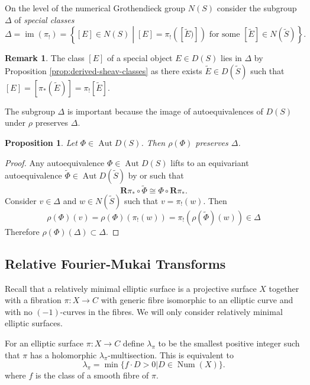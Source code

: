 \documentclass[a4paper, 12pt, twoside]{amsart}
\theoremstyle{plain}
\newtheorem{proposition}[theorem]{Proposition}
\theoremstyle{definition}
\newtheorem{remark}[theorem]{Remark}
\DeclareMathOperator{\iso}{\cong}
\DeclareMathOperator{\num}{Num}
\DeclareMathOperator{\im}{im}
\DeclareMathOperator{\Aut}{Aut}
\begin{document}
On the level of the numerical Grothendieck group $N(S)$ consider
the subgroup $\Delta$ of \emph{special classes}
\[
  \Delta = \im(\pi_!) = \left\{ [E] \in N(S) \middle| [E] =
    \pi_!([\widetilde{E})]) \text{ for some } [\widetilde{E}] \in
    N(\widetilde{S}) \right\}.
\]

\begin{remark}
  The class $[E]$ of a special object $E \in D(S)$ lies in $\Delta$ by
  Proposition \ref{prop:derived-sheav-classes} as there exists
  $\widetilde{E} \in D(\widetilde{S})$ such that
  $[E] = [\pi_*(\widetilde{E})] = \pi_![\widetilde{E}]$.
\end{remark}

The subgroup $\Delta$ is important because the image of
autoequivalences of $D(S)$ under $\rho$ preserves $\Delta$.

\begin{proposition}\label{prop:auto-delta}
  Let $\Phi \in \Aut D(S)$. Then $\rho(\Phi)$ preserves $\Delta$.
\end{proposition}
\begin{proof}
Any autoequivalence $\Phi \in \Aut D(S)$ lifts to an equivariant
autoequivalence $\widetilde{\Phi} \in \Aut D(\widetilde{S})$ by
\cite[Theorem 4.5]{MR1629929} or \cite[Theorem 7.13]{MR2511017} such
that
\[
  \mathbf{R}\pi_* \circ \widetilde{\Phi} \iso \Phi \circ
  \mathbf{R}\pi_*.
\] 
Consider $v \in \Delta$ and $w \in N(\widetilde{S})$ such that
$v = \pi_!(w)$. Then
\[
  \rho(\Phi)(v) = \rho(\Phi)(\pi_!(w)) =
  \pi_!(\rho(\widetilde{\Phi})(w)) \in \Delta
\]
Therefore $\rho(\Phi)(\Delta) \subset \Delta$.
\end{proof}



\subsection{Relative Fourier-Mukai Transforms}
\label{sec:relat-four-mukai}

Recall that a relatively minimal elliptic surface is a projective
surface $X$ together with a fibration $\pi \colon X \to C$ with
generic fibre isomorphic to an elliptic curve and with no
$(-1)$-curves in the fibres. We will only consider relatively minimal
elliptic surfaces.

For an elliptic surface $\pi \colon X \to C$ define $\lambda_{\pi}$ to
be the smallest positive integer such that $\pi$ has a holomorphic
$\lambda_{\pi}$-multisection. This is equivalent to 
\[ 
  \lambda_{\pi} = \min \{f \cdot D >0 | D \in \num(X)\}.
\]
where $f$ is the class of a smooth fibre of $\pi$.
\end{document}
